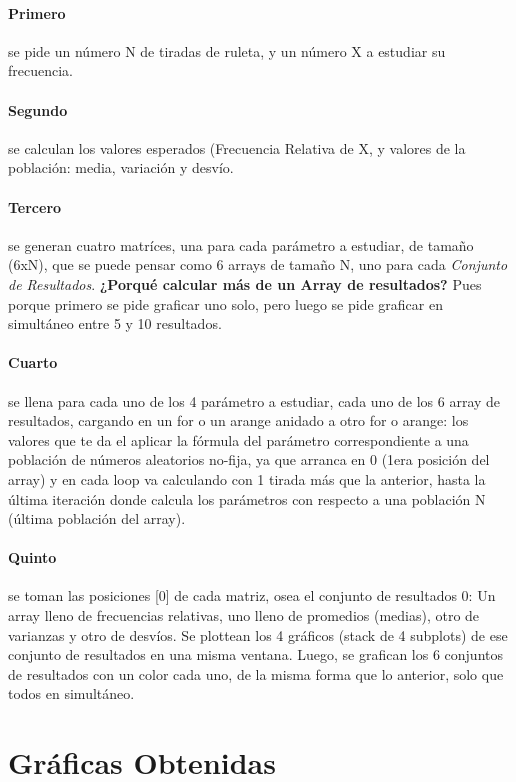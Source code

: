\documentclass[a4paper]{article}
\begin{document}
\paragraph{Primero} se pide un número N de tiradas de ruleta, y un número X a estudiar su frecuencia.
\paragraph{Segundo} se calculan los valores esperados (Frecuencia Relativa de X, y valores de la población: media, variación y desvío.
\paragraph{Tercero} se generan cuatro matríces, una para cada parámetro a estudiar, de tamaño (6xN), que se puede pensar como 6 arrays de tamaño N, uno para cada \textit{Conjunto de Resultados}. \textbf{¿Porqué calcular más de un Array de resultados?} Pues porque primero se pide graficar uno solo, pero luego se pide graficar en simultáneo entre 5 y 10 resultados.
\paragraph{Cuarto} se llena para cada uno de los 4 parámetro a estudiar, cada uno de los 6 array de resultados, cargando en un for o un arange anidado a otro for o arange: los valores que te da el aplicar la fórmula del parámetro correspondiente a una población de números aleatorios no-fija, ya que arranca en 0 (1era posición del array) y en cada loop va calculando con 1 tirada más que la anterior, hasta la última iteración donde calcula los parámetros con respecto a una población N (última población del array).
\paragraph{Quinto} se toman las posiciones [0] de cada matriz, osea el conjunto de resultados 0: Un array lleno de frecuencias relativas, uno lleno de promedios (medias), otro de varianzas y otro de desvíos. Se plottean los 4 gráficos (stack de 4 subplots) de ese conjunto de resultados en una misma ventana. Luego, se grafican los 6 conjuntos de resultados con un color cada uno, de la misma forma que lo anterior, solo que todos en simultáneo.

\newpage
\section{Gráficas Obtenidas}
\label{sec:graficas}
\end{document}
